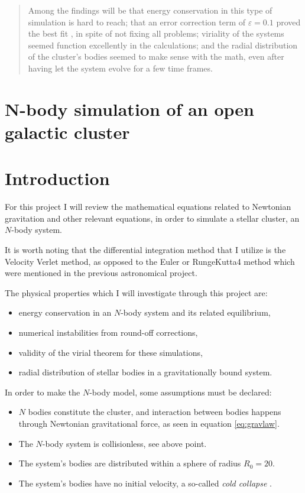 \documentclass[11pt,a4paper,notitlepage,twocolumn]{article}
\begin{document}
\begin{titlingpage}
\begin{center}
\begin{abstract}
Among the findings will be that energy conservation in this type of simulation is hard to reach; that an error correction term of $\varepsilon = 0.1$ proved the best fit , in spite of not fixing all problems; viriality of the systems seemed function excellently in the calculations; and the radial distribution of the cluster's bodies seemed to make sense with the math, even after having let the system evolve for a few time frames.
		\end{abstract}

		\newpage
		\tableofcontents

	\end{center}
\end{titlingpage}



\newpage

\section*{N-body simulation of an open galactic cluster}
\section{Introduction}
For this project I will review the mathematical equations related to Newtonian gravitation and other relevant equations, in order to simulate a stellar cluster, an $N$-body system.

It is worth noting that the differential integration method that I utilize is the Velocity Verlet method, as opposed to the Euler or RungeKutta4 method which were mentioned in the previous astronomical project.

The physical properties which I will investigate through this project are:
\begin{itemize}
\item energy conservation in an $N$-body system and its related equilibrium,
\item numerical instabilities from round-off corrections,
\item validity of the virial theorem for these simulations,
\item radial distribution of stellar bodies in a gravitationally bound system.
\end{itemize}

In order to make the $N$-body model, some assumptions must be declared:
\begin{itemize}
\item $N$ bodies constitute the cluster, and interaction between bodies happens through Newtonian gravitational force, as seen in equation \ref{eq:gravlaw}.
\item The $N$-body system is collisionless, see above point.
\item The system's bodies are distributed within a sphere of radius $R_0 = 20$.
\item The system's bodies have no initial velocity, a so-called \textit{cold collapse} .
\end{itemize}
\end{document}
